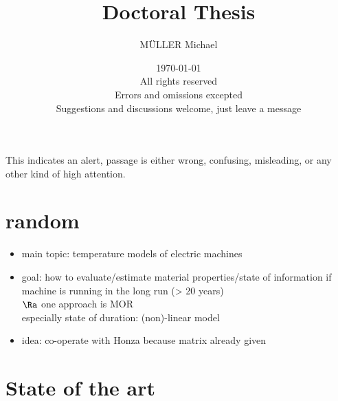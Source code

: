 \documentclass{scrartcl}
\begin{document}
\title{Doctoral Thesis}
\author{\uppercase{Müller} Michael}
\date{\today \\ All rights reserved\tcr \\ \centering Errors and omissions excepted \\ Suggestions and discussions welcome, just leave a message}

\maketitle
\listoftodos[Notes]
\printbibliography


\alert{This indicates an alert, passage is either wrong, confusing, misleading, or any other kind of high attention.}



\section{random}

\begin{itemize}
	\item main topic: temperature models of electric machines
	\item goal: how to evaluate/estimate material properties/state of information if machine is running in the long run (> 20 years)\\
	$\Ra$ one approach is MOR \\
	especially state of duration: (non)-linear model
	\item idea: co-operate with Honza because matrix already given
\end{itemize}







\section{State of the art}
\end{document}
